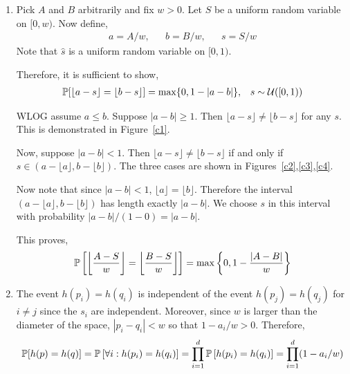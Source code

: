 \documentclass[10pt]{article}
\begin{document}
\begin{solution}[Solution]
\begin{enumerate}[label=(\alph*)]
    \item Pick \( A \) and \( B \) arbitrarily and fix \( w > 0 \). Let \( S \) be a uniform random variable on \( [0,w) \). Now define,
        \begin{align*}
            a = A/w, 
            && b = B/w,
            && s = S/w
        \end{align*}
        Note that \( \hat{s} \) is a uniform random variable on \( [0,1) \). 
        
        Therefore, it is sufficient to show,
        \begin{align*}
            \mathbb{P}[ \lfloor a-s \rfloor = \lfloor b-s \rfloor] = \max\{0,1-|a-b|\}, && s\sim \mathcal{U}([0,1))
        \end{align*}

        WLOG assume \( a \leq b \). Suppose \( |a-b| \geq 1 \). Then \( \lfloor a-s \rfloor \neq \lfloor b-s \rfloor \) for any \( s \). This is demonstrated in Figure~\ref{c1}.

        Now, suppose \( |a-b| < 1 \). Then \( \lfloor a-s \rfloor \neq \lfloor b-s \rfloor \) if and only if \( s \in (a-\lfloor a \rfloor , b-\lfloor b \rfloor ) \). The three cases are shown in Figures~\ref{c2},\ref{c3},\ref{c4}.

        

        Now note that since \( |a-b| < 1 \), \( \lfloor a \rfloor = \lfloor b \rfloor \). Therefore the interval \( (a-\lfloor a \rfloor , b - \lfloor b \rfloor ) \) has length exactly \( |a-b| \). We choose \( s \) in this interval with probability \( |a-b| / (1-0) = |a-b| \). 
        
        This proves,
        \begin{align*}
            \mathbb{P} \left[ \left\lfloor \frac{A-S}{w} \right\rfloor = \left\lfloor \frac{B-S}{w}  \right\rfloor \right] = \max \left\{ 0, 1 - \frac{|A-B|}{w}  \right\}
        \end{align*}
        

    \item 
        The event \( h(p_i) = h(q_i) \) is independent of the event \( h(p_j) = h(q_j) \) for \( i\neq j \) since the \( s_i \) are independent.
        Moreover, since \( w \) is larger than the diameter of the space, \( |p_i-q_i| < w \) so that \( 1-a_i/w  > 0 \). Therefore, 
        \begin{align*}
            \mathbb{P}[h(p) = h(q)]
            = \mathbb{P} \left[ \forall i : h(p_i) = h(q_i) \right]
            = \prod_{i=1}^{d} \mathbb{P} \left[ h(p_i) = h(q_i) \right]
            = \prod_{i=1}^{d} (1-a_i/w)
        \end{align*}
        

\end{enumerate}
\end{solution}
\end{document}
